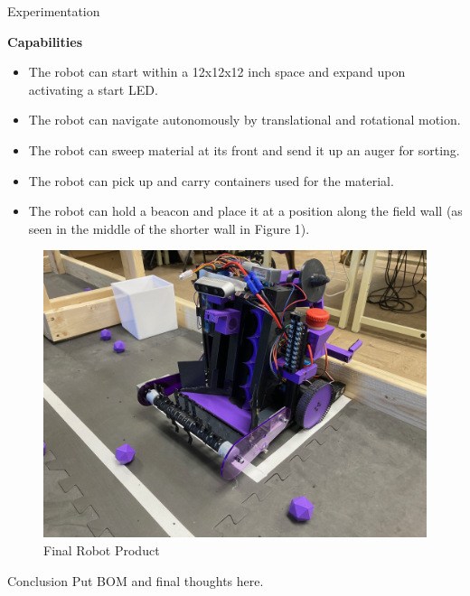 \documentclass[final]{beamer}
\newlength{\colwidth}
\begin{document}
\begin{frame}[t]
\begin{columns}[t]
\begin{column}{\colwidth}
    \begin{block}{Experimentation}
    \item \textbf{Capabilities}
        \begin{itemize}
          \item The robot can start within a 12x12x12 inch space and expand upon activating a start LED.
          \item The robot can navigate autonomously by translational and rotational motion.
          \item The robot can sweep material at its front and send it up an auger for sorting.
          \item The robot can pick up and carry containers used for the material.
          \item The robot can hold a beacon and place it at a position along the field wall (as seen in the middle of the shorter wall in Figure 1).
        \end{itemize}

    \begin{figure}
      \centering
      \includegraphics[width=20.0cm]{Robot_Practice_Field.jpg}
      \caption{Final Robot Product}
    \end{figure}

  \end{block}


  \begin{block}{Conclusion}
    Put BOM and final thoughts here.

  \begin{columns}[t]
  

\end{columns}
\end{block}
\end{column}
\end{columns}
\end{frame}
\end{document}
